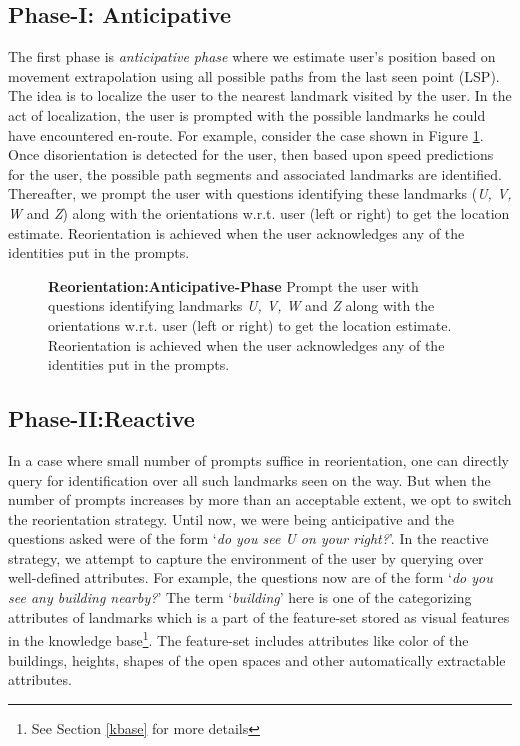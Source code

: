 \documentclass{iitkthesis}
\begin{document}
\subsection*{Phase-I: Anticipative}
The first phase is \textit{anticipative phase} where we estimate user's position based on movement extrapolation using all possible paths from the last seen point (LSP). The idea is to localize the user to the nearest landmark visited by the user. In the act of localization, the user is prompted with the possible landmarks he could have encountered en-route. For example, consider the case shown in Figure \ref{fig:anticipative}. Once disorientation is detected for the user, then based upon speed predictions for the user, the possible path segments and associated landmarks are identified. Thereafter, we prompt the user with questions identifying these landmarks (\textit{U, V, W} and \textit{Z}) along with the orientations w.r.t. user (left or right) to get the location estimate. Reorientation is achieved when the user acknowledges any of the identities put in the prompts.
\begin{figure}
\centering
{}
\caption{\textbf{Reorientation:Anticipative-Phase} Prompt the user with questions identifying landmarks \textit{U, V, W} and \textit{Z} along with the orientations w.r.t. user (left or right) to get the location estimate. Reorientation is achieved when the user acknowledges any of the identities put in the prompts.}
\label{fig:anticipative}
 \end{figure}
\subsection*{Phase-II:Reactive}
In a case where small number of prompts suffice in reorientation, one can directly query for identification over all such landmarks seen on the way. But when the number of prompts increases by more than an acceptable extent, we opt to switch the reorientation strategy. Until now, we were being anticipative and the questions asked were of the form `\textit{do you see U on your right?}'. In the reactive strategy, we attempt to capture the environment of the user by querying over well-defined attributes. For example, the questions now are of the form `\textit{do you see any building nearby?}' The term `\textit{building}' here is one of the categorizing attributes of landmarks which is a part of the feature-set stored as visual features in the knowledge base\footnote{See Section \ref{kbase} for more details}. The feature-set includes attributes like color of the buildings, heights, shapes of the open spaces and other automatically extractable attributes.
\end{document}
